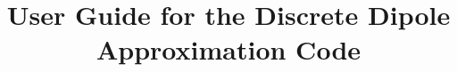 
\setlength{\textwidth}{6.5in}
\setlength{\textheight}{9.0in}
\setlength{\oddsidemargin}{0.0in}
\setlength{\evensidemargin}{0.0in}
\setlength{\topmargin}{-0.5in}

\makeindex

\title{
  \vspace*{-3em} 
	{\bf User Guide for the Discrete Dipole} \\
	{\bf Approximation Code \ddscatv}}
                                
